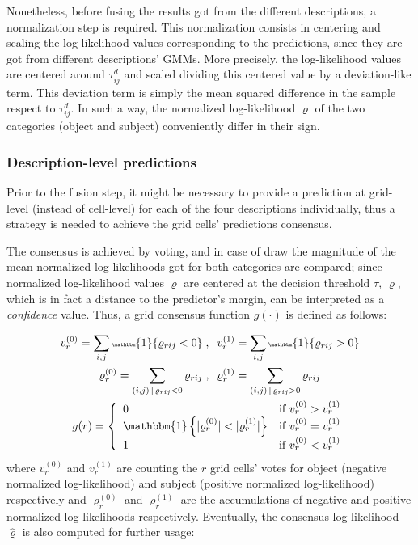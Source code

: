 \documentclass[10pt,twocolumn,letterpaper]{article}
\begin{document}
Nonetheless, before fusing the results got from the different descriptions, a normalization step is required. This normalization consists in centering and scaling the log-likelihood values corresponding to the predictions, since they are got from different descriptions' GMMs. More precisely, the log-likelihood values are centered around $\tau_{ij}^{d}$ and scaled dividing this centered value by a deviation-like term. This deviation term is simply the mean squared difference in the sample respect to $\tau_{ij}^{d}$. In such a way, the normalized log-likelihood $\varrho$ of the two categories (object and subject) conveniently differ in their sign.

\subsubsection{Description-level predictions}
\label{sssec:descriptionlevelpredictions}

Prior to the fusion step, it might be necessary to provide a prediction at grid-level (instead of cell-level) for each of the four descriptions individually, thus a strategy is needed to achieve the grid cells' predictions consensus. 

The consensus is achieved by voting, and in case of draw the magnitude of the mean normalized log-likelihoods got for both categories are compared; since normalized log-likelihood values $\varrho$ are centered at the decision threshold $\tau$, $\varrho$, which is in fact a distance to the predictor's margin, can be interpreted as a \textit{confidence} value. Thus, a grid consensus function $g(\cdot)$ is defined as follows:

\begin{gather*}\tiny
v_r^{(0)} = \sum_{i,j} \mathbbm{1}\{\varrho_{rij} < 0\} \;,\;\; v_r^{(1)} = \sum_{i,j} \mathbbm{1}\{\varrho_{rij} > 0\}  \\
\varrho_{r}^{(0)} = \sum_{(i,j) \,|\, \varrho_{rij} < 0} \varrho_{rij} \;,\;\; \varrho_{r}^{(1)} = \sum_{(i,j) \,|\, \varrho_{rij} > 0} \varrho_{rij} \\
g(r) =
\left\{
	\begin{array}{ll}
		0  & \mbox{if }  v_r^{(0)} > v_r^{(1)} \\
		\mathbbm{1}\left\{ |\varrho_{r}^{(0)}| < |\varrho_{r}^{(1)}| \right\} &  \mbox{if } v_r^{(0)} = v_r^{(1)} \\
		1 & \mbox{if }  v_r^{(0)} < v_r^{(1)} \\
	\end{array}
\right.
\end{gather*}
where $v_r^{(0)}$ and $v_r^{(1)}$ are counting the $r$ grid cells' votes for object (negative normalized log-likelihood) and subject (positive normalized log-likelihood) respectively and $\varrho_r^{(0)}$ and $\varrho_r^{(1)}$ are the accumulations of negative and positive normalized log-likelihoods respectively. Eventually, the consensus log-likelihood $\hat{\varrho}$ is also computed for further usage:
\end{document}
